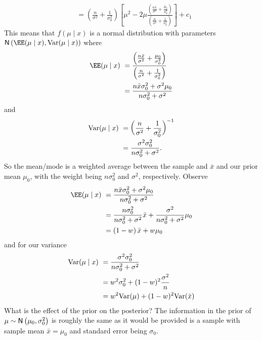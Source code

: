 \begin{exam}
\begin{align*}
         & = \left( \frac{n}{\sigma^2} + \frac{1}{\sigma_0^2} \right) \left[ \mu^2 - 2 \mu \frac{\left( \frac{n \bar{x}}{\sigma^2} + \frac{\mu_0}{\sigma_0^2} \right)}{\left( \frac{n}{\sigma^2} + \frac{1}{\sigma_0^2} \right)} \right] + c_1
    \end{align*}
    This means that $f(\mu \mid x)$ is a normal distribution with parameters $\Nor \left( \EE (\mu \mid x) , \Var (\mu \mid x) \right)$ where
    \begin{align*}
        \EE (\mu \mid x) \
         & = \frac{\left( \frac{n \bar{x}}{\sigma^2} + \frac{\mu_0}{\sigma_0^2} \right)}{\left( \frac{n}{\sigma^2} + \frac{1}{\sigma_0^2} \right)} \\
         & = \frac{n \bar{x} \sigma_0^2 + \sigma^2 \mu_0}{n \sigma_0^2 + \sigma^2}
    \end{align*}
    and
    \begin{align*}
        {\operatorname{Var}} (\mu \mid x) \
         & = \left( \frac{n}{\sigma^2} + \frac{1}{\sigma_0^2} \right)^{-1} \\
         & = \frac{\sigma^2 \sigma_0^2}{n \sigma_0^2 + \sigma^2}.
    \end{align*}
    So the mean/mode is a weighted average between the sample and $\bar{x}$ and our prior mean $\mu_0$, with the weight being $n \sigma_0^2$ and $\sigma^2$, respectively. Observe
    \begin{align*}
        \EE (\mu \mid x) \
         & = \frac{n \bar{x} \sigma_0^2 + \sigma^2 \mu_0}{n \sigma_0^2 + \sigma^2}                                 \\
         & = \frac{n \sigma_0^2}{n \sigma_0^2 + \sigma^2} \bar{x} + \frac{\sigma^2}{n \sigma_0^2 + \sigma^2} \mu_0 \\
         & = \left( 1 - w \right) \bar{x} + w \mu_0
    \end{align*}
    and for our variance
    \begin{align*}
        {\operatorname{Var}} (\mu \mid x) \
         & = \frac{\sigma^2 \sigma_0^2}{n \sigma_0^2 + \sigma^2} \\
         & = w^2 \sigma_0^2 + (1- w)^2 \frac{\sigma^2}{n}        \\
         & = w^2 {\operatorname{Var}} (\mu) + (1- w)^2 {\operatorname{Var}} (\bar{x})
    \end{align*}
    What is the effect of the prior on the posterior? The information in the prior of $\mu \sim {\sf N} \left( \mu_0 , \sigma_0^2 \right)$ is roughly the same as it would be provided is a sample with sample mean $\bar{x} = \mu_0$ and standard error being $\sigma_0$.
\end{exam}

